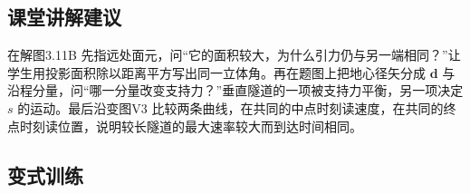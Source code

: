 \documentclass[UTF8,fontset=fandol,a4paper,11pt]{ctexart}
\newcommand{\vect}[1]{\bm{#1}}
\begin{document}


\subsection*{课堂讲解建议}

在解图3.11B 先指远处面元，问“它的面积较大，为什么引力仍与另一端相同？”让学生用投影面积除以距离平方写出同一立体角。再在题图上把地心径矢分成 $\vect d$ 与沿程分量，问“哪一分量改变支持力？”垂直隧道的一项被支持力平衡，另一项决定 $s$ 的运动。最后沿变图V3 比较两条曲线，在共同的中点时刻读速度，在共同的终点时刻读位置，说明较长隧道的最大速率较大而到达时间相同。



\subsection*{变式训练}
\end{document}
